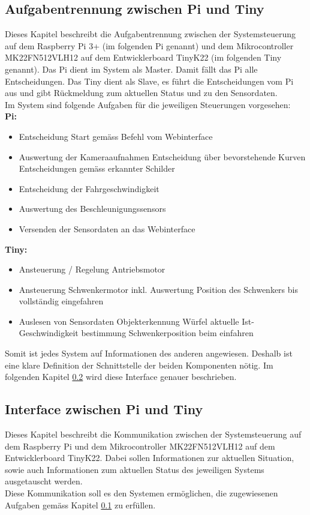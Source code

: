 \documentclass[../../main.tex]{subfiles}
\begin{document}
    \subsection{Aufgabentrennung zwischen Pi und Tiny} \label{aufgabentrennung_pi_tiny}
    Dieses Kapitel beschreibt die Aufgabentrennung zwischen der Systemsteuerung auf dem Raspberry Pi 3+ (im folgenden Pi genannt) und dem Mikrocontroller MK22FN512VLH12 auf dem Entwicklerboard TinyK22 (im folgenden Tiny genannt). Das Pi dient im System als Master. Damit fällt das Pi alle Entscheidungen. Das Tiny dient als Slave, es führt die Entscheidungen vom Pi aus und gibt Rückmeldung zum aktuellen Status und zu den Sensordaten.\\
    Im System sind folgende Aufgaben für die jeweiligen Steuerungen vorgesehen:\\
    \textbf{Pi:}
    \begin{itemize}
        \item Entscheidung Start gemäss Befehl vom Webinterface
        \item Auswertung der Kameraaufnahmen
            \subitem Entscheidung über bevorstehende Kurven
            \subitem Entscheidungen gemäss erkannter Schilder
        \item Entscheidung der Fahrgeschwindigkeit
        \item Auswertung des Beschleunigungssensors
        \item Versenden der Sensordaten an das Webinterface
    \end{itemize}

    \textbf{Tiny:}
    \begin{itemize}
        \item Ansteuerung / Regelung Antriebsmotor
        \item Ansteuerung Schwenkermotor
            \subitem inkl. Auswertung Position des Schwenkers bis vollständig eingefahren
        \item Auslesen von Sensordaten
            \subitem Objekterkennung Würfel
            \subitem aktuelle Ist-Geschwindigkeit
            \subitem bestimmung Schwenkerposition beim einfahren
    \end{itemize}

    Somit ist jedes System auf Informationen des anderen angewiesen. Deshalb ist eine klare Definition der Schnittstelle der beiden Komponenten nötig. Im folgenden Kapitel \ref{interface_pi_tiny} wird diese Interface genauer beschrieben.

    \subsection{Interface zwischen Pi und Tiny} \label{interface_pi_tiny}
    Dieses Kapitel beschreibt die Kommunikation zwischen der Systemsteuerung auf dem Raspberry Pi und dem Mikrocontroller MK22FN512VLH12 auf dem Entwicklerboard TinyK22. Dabei sollen Informationen zur aktuellen Situation, sowie auch Informationen zum aktuellen Status des jeweiligen Systems ausgetauscht werden.\\
    Diese Kommunikation soll es den Systemen ermöglichen, die zugewiesenen Aufgaben gemäss Kapitel \ref{aufgabentrennung_pi_tiny} zu erfüllen.
\end{document}

